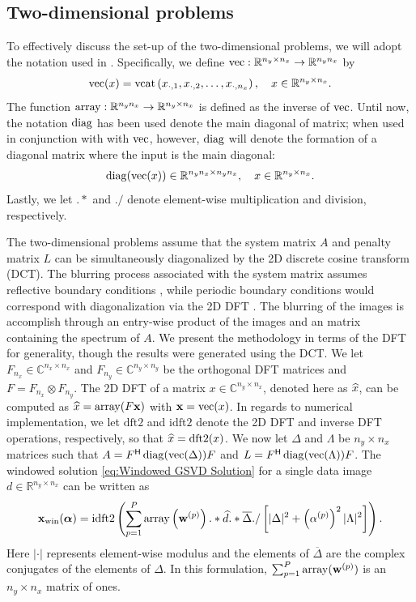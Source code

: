 \documentclass[12pt]{article}
\begin{document}
\subsection{Two-dimensional problems} \label{sec:2D}

To effectively discuss the set-up of the two-dimensional problems, we will adopt the notation used in \cite{Vogel:2002}. Specifically, we define $\operatorname{vec} : \mathbb{R}^{n_y \times n_x} \rightarrow \mathbb{R}^{n_y n_x}$ by
\[\operatorname{vec}(x) = \operatorname{vcat}\left(x_{\cdot,1},x_{\cdot,2},\ldots,x_{\cdot,n_x}\right), \quad x \in \mathbb{R}^{n_y \times n_x}.\]
The function $\operatorname{array} : \mathbb{R}^{n_y n_x} \rightarrow \mathbb{R}^{n_y \times n_x}$ is defined as the inverse of $\operatorname{vec}$. Until now, the notation $\operatorname{diag}$ has been used denote the main diagonal of matrix; when used in conjunction with with $\operatorname{vec}$, however, $\operatorname{diag}$ will denote the formation of a diagonal matrix where the input is the main diagonal:
\[\operatorname{diag}(\operatorname{vec}(x)) \in \mathbb{R}^{n_y n_x \times n_y n_x}, \quad x \in \mathbb{R}^{n_y \times n_x}.\]
Lastly, we let $.*$ and $./$ denote element-wise multiplication and division, respectively.


The two-dimensional problems assume that the system matrix $A$ and penalty matrix $L$ can be simultaneously diagonalized by the 2D discrete cosine transform (DCT). The blurring process associated with the system matrix assumes reflective boundary conditions \cite{HansenNagyOLeary}, while periodic boundary conditions would correspond with diagonalization via the 2D DFT \cite{Vogel:2002}. The blurring of the images is accomplish through an entry-wise product of the images and an matrix containing the spectrum of $A$. We present the methodology in terms of the DFT for generality, though the results were generated using the DCT. We let $F_{n_x} \in \mathbb{C}^{n_x \times n_x}$ and $F_{n_y} \in \mathbb{C}^{n_y \times n_y}$ be the orthogonal DFT matrices and $F  = F_{n_x} \otimes F_{n_y}$. The 2D DFT of a matrix $x \in \mathbb{C}^{n_y \times n_x}$, denoted here as $\widehat{x}$, can be computed as $\widehat{x} = \operatorname{array}(F\mathbf{x})$ with $\mathbf{x} = \operatorname{vec}(x)$. In regards to numerical implementation, we let $\text{dft2}$ and $\text{idft2}$ denote the 2D DFT and inverse DFT operations, respectively, so that $\widehat{x} = \text{dft2}(x)$. We now let $\Delta$ and $\Lambda$ be $n_y \times n_x$ matrices such that $A = {F}^\mathsf{H}\operatorname{diag}(\text{vec}(\Delta))F$ and $L = {F}^\mathsf{H}\operatorname{diag}(\text{vec}(\Lambda))F$. The windowed solution \eqref{eq:Windowed GSVD Solution} for a single data image $d \in \mathbb{R}^{n_y \times n_x}$ can be written as
\[\mathbf{x}_{\text{win}}(\bm{\alpha}) = \text{idft2}\left(\sum_{p=1}^P \operatorname{array}\left(\mathbf{w}^{(p)}\right).*\widehat{d}.*\overline{\Delta}./\left[|\Delta|^2 + \left(\alpha^{(p)}\right)^2 |\Lambda|^2\right]\right).\]
Here $|\cdot|$ represents element-wise modulus and the elements of $\overline{\Delta}$ are the complex conjugates of the elements of $\Delta$. In this formulation, $\sum_{p=1}^P \operatorname{array}(\mathbf{w}^{(p)})$ is an $n_y \times n_x$ matrix of ones. 
\end{document}
